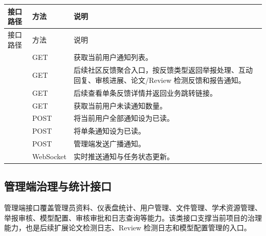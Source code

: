 \begingroup
\small
\setlength{\tabcolsep}{4pt}
\renewcommand{\arraystretch}{1.15}
\begin{longtable}{|L{6.2cm}|L{1.4cm}|L{5.6cm}|}
\hline
接口路径 & 方法 & 说明 \\ \hline
\endfirsthead
\hline
接口路径 & 方法 & 说明 \\ \hline
\endhead
\hline
\endfoot
\hline
\endlastfoot
{} & GET & 获取当前用户通知列表。 \\ \hline
{} & GET & 后续社区反馈聚合入口，按反馈类型返回举报处理、互动回复、审核进展、论文/Review 检测反馈和报告通知。 \\ \hline
{} & GET & 后续查看单条反馈详情并返回业务跳转链接。 \\ \hline
{} & GET & 获取当前用户未读通知数量。 \\ \hline
{} & POST & 将当前用户全部通知设为已读。 \\ \hline
{} & POST & 将单条通知设为已读。 \\ \hline
{} & POST & 管理端发送广播通知。 \\ \hline
{} & WebSocket & 实时推送通知与任务状态更新。 \\ \hline
\end{longtable}
\endgroup

\subsection{管理端治理与统计接口}
管理端接口覆盖管理员资料、仪表盘统计、用户管理、文件管理、学术资源管理、举报审核、模型配置、审核审批和日志查询等能力。该类接口支撑当前项目的治理能力，也是后续扩展论文检测日志、Review 检测日志和模型配置管理的入口。

